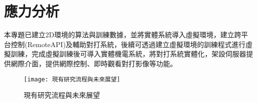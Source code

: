 \chapter{應力分析}
本專題已建立2D環境的算法與訓練數據，並將實體系統導入虛擬環境，建立跨平台控制(RemoteAPI)及輔助對打系統，後續可透過建立虛擬環境的訓練程式進行虛擬訓練，完成虛擬訓練後可導入實體機電系統，將對打系統實體化，架設伺服器提供網際介面，提供網際控制、即時觀看對打影像等功能。
\begin{figure}[hbt!]
\begin{center}
\texttt{[image: 現有研究流程與未來展望]}
\caption{\Large 現有研究流程與未來展望}
\label{fig.現有研究流程與未來展望}
\end{center}
\end{figure}

